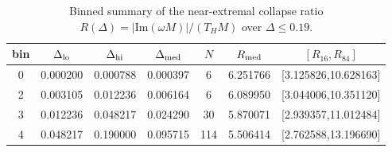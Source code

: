 \begin{table}[t]
\centering
\begin{tabular}{ccccccc}
\hline
bin & $\Delta_{\rm lo}$ & $\Delta_{\rm hi}$ & $\Delta_{\rm med}$ & $N$ & $R_{\rm med}$ & $[R_{16},R_{84}]$ \\
\hline
0 & 0.000200 & 0.000788 & 0.000397 & 6 & 6.251766 & [3.125826,10.628163] \\
2 & 0.003105 & 0.012236 & 0.006164 & 6 & 6.089950 & [3.044006,10.351120] \\
3 & 0.012236 & 0.048217 & 0.024290 & 30 & 5.870071 & [2.939357,11.012484] \\
4 & 0.048217 & 0.190000 & 0.095715 & 114 & 5.506414 & [2.762588,13.196690] \\
\hline
\end{tabular}
\caption{Binned summary of the near-extremal collapse ratio $R(\Delta)=|\mathrm{Im}(\omega M)|/(T_H M)$ over $\Delta\le 0.19$.}
\label{tab:ratio_collapse_binned}
\end{table}
